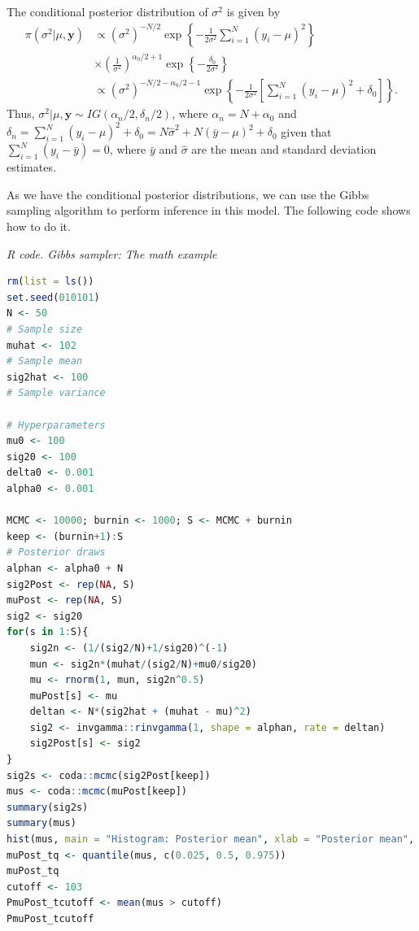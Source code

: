 \begin{enumerate}[leftmargin=*]
The conditional posterior distribution of $\sigma^2$ is given by
\begin{align*}
	\pi(\sigma^2|\mu,\bm{y})&\propto (\sigma^2)^{-N/2}\exp\left\{-\frac{1}{2\sigma^2}\sum_{i=1}^N(y_i-\mu)^2\right\}\\
	&\times \left(\frac{1}{\sigma^2}\right)^{\alpha_0/2+1}\exp\left\{-\frac{\delta_0}{2\sigma^2}\right\}\\
	&\propto (\sigma^2)^{-N/2-\alpha_0/2-1} \exp\left\{-\frac{1}{2\sigma^2}\left[\sum_{i=1}^N(y_i-\mu)^2+\delta_0\right]\right\}.
\end{align*} 
Thus, $\sigma^2|\mu,\bm{y}\sim IG(\alpha_n/2,\delta_n/2)$, where $\alpha_n=N+\alpha_0$ and $\delta_n=\sum_{i=1}^N(y_i-\mu)^2+\delta_0=N\hat{\sigma}^2+N(\bar{y}-\mu)^2+\delta_0$ given that $\sum_{i=1}^N(y_i-\bar{y})=0$, where $\bar{y}$ and $\hat{\sigma}$ are the mean and standard deviation estimates.

As we have the conditional posterior distributions, we can use the Gibbs sampling algorithm to perform inference in this model. The following code shows how to do it.

\begin{tcolorbox}[enhanced,width=4.67in,center upper,
	fontupper=\large\bfseries,drop shadow southwest,sharp corners]
	\textit{R code. Gibbs sampler: The math example}
	\begin{VF}
		\begin{lstlisting}[language=R]
rm(list = ls())
set.seed(010101)
N <- 50
# Sample size
muhat <- 102
# Sample mean
sig2hat <- 100
# Sample variance

# Hyperparameters
mu0 <- 100
sig20 <- 100
delta0 <- 0.001
alpha0 <- 0.001

MCMC <- 10000; burnin <- 1000; S <- MCMC + burnin
keep <- (burnin+1):S
# Posterior draws
alphan <- alpha0 + N
sig2Post <- rep(NA, S)
muPost <- rep(NA, S)
sig2 <- sig20
for(s in 1:S){
	sig2n <- (1/(sig2/N)+1/sig20)^(-1)
	mun <- sig2n*(muhat/(sig2/N)+mu0/sig20)
	mu <- rnorm(1, mun, sig2n^0.5)
	muPost[s] <- mu
	deltan <- N*(sig2hat + (muhat - mu)^2)
	sig2 <- invgamma::rinvgamma(1, shape = alphan, rate = deltan)
	sig2Post[s] <- sig2
}
sig2s <- coda::mcmc(sig2Post[keep]) 
mus <- coda::mcmc(muPost[keep]) 
summary(sig2s)
summary(mus)
hist(mus, main = "Histogram: Posterior mean", xlab = "Posterior mean", col = "blue", breaks = 50)
muPost_tq <- quantile(mus, c(0.025, 0.5, 0.975))
muPost_tq
cutoff <- 103
PmuPost_tcutoff <- mean(mus > cutoff)
PmuPost_tcutoff
\end{lstlisting}
	\end{VF}
\end{tcolorbox} 


\end{enumerate}
